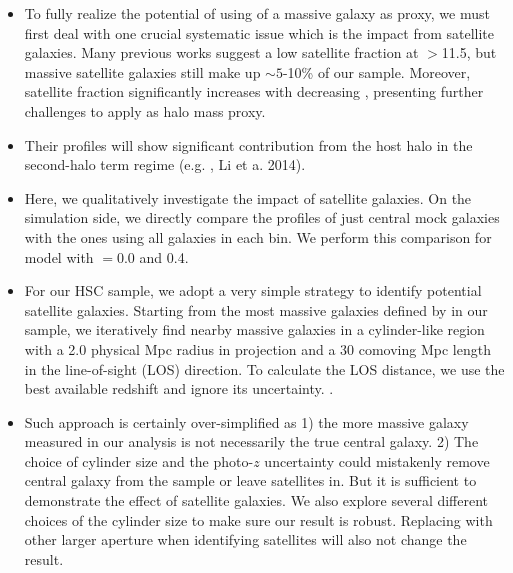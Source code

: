 \documentclass[a4paper,fleqn,usenatbib]{mnras}
\begin{document}
    \begin{itemize}

        \item To fully realize the potential of using \mstar{} of a massive galaxy as \mhalo{}
            proxy, we must first deal with one crucial systematic issue which is the impact
            from satellite galaxies.
            Many previous works suggest a low satellite fraction at \logms{}$>$11.5, but
            massive satellite galaxies still make up $\sim 5$-10\% of our sample.
            Moreover, satellite fraction significantly increases with decreasing \mstar{},
            presenting further challenges to apply \mstar{} as halo mass proxy.

        \item {}
            Their \dsigma{} profiles will show significant contribution from the host halo
            in the second-halo term regime (e.g. \addref{}, Li et a. 2014).

        \item Here, we qualitatively investigate the impact of satellite galaxies.
            On the simulation side, we directly compare the \dsigma{} profiles of just central
            mock galaxies with the ones using all galaxies in each bin.
            We perform this comparison for model with \sigmh{}$=0.0$ and 0.4.

        \item For our HSC sample, we adopt a very simple strategy to identify potential
            satellite galaxies.
            Starting from the most massive galaxies defined by \mmax{} in our sample,
            we iteratively find nearby massive galaxies in a cylinder-like region with
            a 2.0 physical Mpc radius in projection and a 30 comoving Mpc length in the
            line-of-sight (LOS) direction.
            To calculate the LOS distance, we use the best available redshift and ignore
            its uncertainty.
            .

        \item Such approach is certainly over-simplified as 1) the more massive galaxy
            measured in our analysis is not necessarily the true central galaxy.
            2) The choice of cylinder size and the photo-$z$ uncertainty could mistakenly
            remove central galaxy from the sample or leave satellites in.
            But it is sufficient to demonstrate the effect of satellite galaxies.
            We also explore several different choices of the cylinder size to make sure
            our result is robust.
            Replacing \mmax{} with other larger aperture \mstar{} when identifying satellites
            will also not change the result.


\end{itemize}
\end{document}
